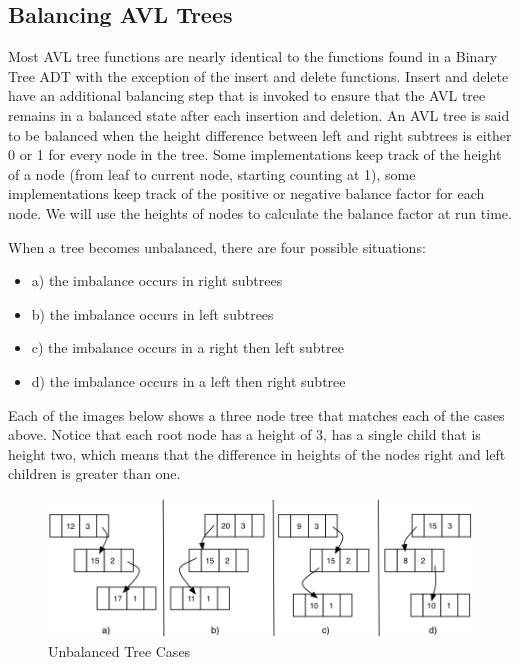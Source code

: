 \subsection{Balancing AVL Trees}
Most AVL tree functions are nearly identical to the functions found in a Binary Tree ADT with the exception of the insert and delete functions. Insert and delete have an additional balancing step that is invoked to ensure that the AVL tree remains in a balanced state after each insertion and deletion. An AVL tree is said to be balanced when the height difference between left and right subtrees is either 0 or 1 for every node in the tree. Some implementations keep track of the height of a node (from leaf to current node, starting counting at 1), some implementations keep track of the positive or negative balance factor for each node. We will use the heights of nodes to calculate the balance factor at run time.

When a tree becomes unbalanced, there are four possible situations:
\begin{itemize}
	\item a) the imbalance occurs in right subtrees
	\item b) the imbalance occurs in left subtrees
	\item c) the imbalance occurs in a right then left subtree
	\item d) the imbalance occurs in a left then right subtree
\end{itemize}



Each of the images below shows a three node tree that matches each of the cases above. Notice that each root node has a height of 3, has a single child that is height two, which means that the difference in heights of the nodes right and left children is greater than one.

\begin{figure}[H]
\centering
\includegraphics{pictures/tree15.png}
\caption{Unbalanced Tree Cases}
\label{fig:tree15}
\end{figure}

